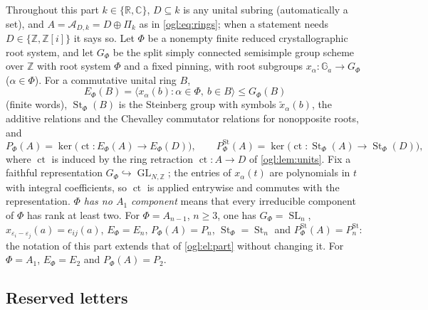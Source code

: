 \documentclass[11pt,oneside]{article}
\numberwithin{equation}{section}
\theoremstyle{definition}
\theoremstyle{remark}
\newcommand{\Z}{\mathbb Z}
\newcommand{\R}{\mathbb R}
\newcommand{\C}{\mathbb C}
\newcommand{\A}{\mathcal A}
\newcommand{\Ga}{\mathbb G_a}
\newcommand{\ct}{\operatorname{ct}}
\newcommand{\GL}{\operatorname{GL}}
\newcommand{\SL}{\operatorname{SL}}
\newcommand{\St}{\operatorname{St}}
\begin{document}
Throughout this part $k\in\{\R,\C\}$, $D\subseteq k$ is any unital subring
(automatically a set), and $A=\A_{D,k}=D\oplus\Pi_k$ as in
\eqref{ogl:eq:rings}; when a statement needs $D\in\{\Z,\Z[i]\}$ it says so.
Let $\Phi$ be a nonempty finite reduced crystallographic root system, and let
$G_\Phi$ be the split simply connected semisimple group scheme over $\Z$ with
root system $\Phi$ and a fixed pinning, with root subgroups
$x_\alpha:\Ga\to G_\Phi$ ($\alpha\in\Phi$). For a commutative unital ring $B$,
\[
 E_\Phi(B)=\langle x_\alpha(b):\alpha\in\Phi,\ b\in B\rangle\le G_\Phi(B)
\]
(finite words), $\St_\Phi(B)$ is the Steinberg group with symbols
$\tilde x_\alpha(b)$, the additive relations and the Chevalley commutator
relations for nonopposite roots, and
\[
 P_\Phi(A)=\ker\bigl(\ct:E_\Phi(A)\to E_\Phi(D)\bigr),\qquad
 P^{\St}_\Phi(A)=\ker\bigl(\ct:\St_\Phi(A)\to\St_\Phi(D)\bigr),
\]
where $\ct$ is induced by the ring retraction $\ct:A\to D$ of
\cref{ogl:lem:units}. Fix a faithful representation
$G_\Phi\hookrightarrow\GL_{N,\Z}$; the entries of $x_\alpha(t)$ are polynomials in
$t$ with integral coefficients, so $\ct$ is applied entrywise and commutes with
the representation. \emph{$\Phi$ has no $A_1$ component} means that every
irreducible component of $\Phi$ has rank at least two. For
$\Phi=A_{n-1}$, $n\ge3$, one has $G_\Phi=\SL_n$, $x_{\varepsilon_i-\varepsilon_j}(a)=e_{ij}(a)$,
$E_\Phi=E_n$, $P_\Phi(A)=P_n$, $\St_\Phi=\St_n$ and $P^{\St}_\Phi(A)=P_n^{\St}$:
the notation of this part extends that of \cref{ogl:el:part} without changing
it. For $\Phi=A_1$, $E_\Phi=E_2$ and $P_\Phi(A)=P_2$.

\subsection{Reserved letters}\label{ogl:ch:sub:letters}
\end{document}
